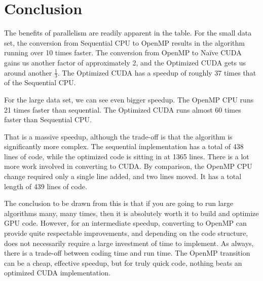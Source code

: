 \documentclass[12pt, oneside]{article}
\begin{document}
\section{Conclusion}
The benefits of parallelism are readily apparent in the table. For the small data set, the conversion from Sequential CPU to OpenMP results in the algorithm running over 10 times faster. The conversion from OpenMP to Na\"ive CUDA gains us another factor of approximately 2, and the Optimized CUDA gets us around another \(\frac{1}{3}\). The Optimized CUDA has a speedup of roughly 37 times that of the Sequential CPU.

For the large data set, we can see even bigger speedup. The OpenMP CPU runs 21 times faster than sequential. The Optimized CUDA runs almost 60 times faster than Sequential CPU.

That is a massive speedup, although the trade-off is that the algorithm is significantly more complex. The sequential implementation has a total of 438 lines of code, while the optimized code is sitting in at 1365 lines. There is a lot more work involved in converting to CUDA. By comparison, the OpenMP CPU change required only a single line added, and two lines moved. It has a total length of 439 lines of code.

The conclusion to be drawn from this is that if you are going to run large algorithms many, many times, then it is absolutely worth it to build and optimize GPU code. However, for an intermediate speedup, converting to OpenMP can provide quite respectable improvements, and depending on the code structure, does not necessarily require a large investment of time to implement. As always, there is a trade-off between coding time and run time. The OpenMP transition can be a cheap, effective speedup, but for truly quick code, nothing beats an optimized CUDA implementation.


\end{document}
